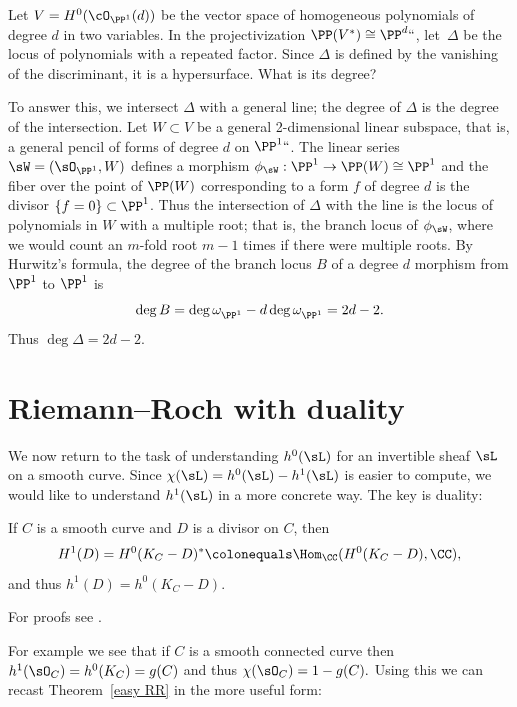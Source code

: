 \begin{example}
Let 
$V= H^0(\cO_{\PP^1}(d))$
be the vector space of  homogeneous polynomials of degree $d$ in
two variables. In the
projectivization $\PP(V^{*}) \cong \PP^d` `$, let~$\Delta$ be the
locus of polynomials with a repeated factor. Since $\Delta$ is
defined by the vanishing of the discriminant, it is a hypersurface.
What is its degree? 
 
To answer this, we intersect $\Delta$ with a general line; the degree
of $\Delta$ is the degree of the intersection.  Let $W\subset V$ be a
general 2-dimensional linear subspace, that is, a general pencil of
forms of degree $d$ on $\PP^1` `$. The linear series $\sW =
(\sO_{\PP^{1}}, W)$ defines a morphism $\phi_{\sW} : \PP^{1} \to
\PP(W) \cong \PP^{1}$ and the fiber over the point of $\PP(W)$
corresponding to a form $f$ of degree $d$ is the divisor $\{f =
0\}\subset \PP^{1}$. Thus the intersection of $\Delta$ with the line
is the locus of polynomials in $W$ with a multiple root; that is, the
branch locus of $\phi_{\sW}$, where we would count an $m$-fold root
$m-1$ times if there were multiple roots. 
 By Hurwitz's formula, the degree of the branch locus $B$ of a 
degree $d$ morphism from $\PP^{1}$ to $\PP^{1}$ is
 $$
 \deg B = \deg \omega^{}_{\PP^{1}} - d\deg \omega^{}_{\PP^{1}} = 2d-2.
 $$
 Thus $\deg \Delta = 2d-2$.
 \end{example}
  

\section{Riemann--Roch with duality}

We now return to the task of understanding $h^0(\sL)$ for an invertible sheaf $\sL$ on a smooth curve. Since $\chi(\sL) = h^0(\sL)-h^1(\sL)$ is easier to compute, we would like to understand $h^1(\sL)$ in a more concrete way. The key is duality:
 
\begin{theorem}\label{sd}
If $C$ is a smooth curve and $D$ is a divisor on $C$, then
%
%
$$
H^1(D) =H^0(K_C-D)^* \colonequals \Hom_\CC(H^0(K_C-D), \CC),
$$
and thus $h^1(D) = h^0(K_C-D)$.
\unif
\end{theorem}

For proofs see \cite[Theorem III.5.2 and III.7.6]{Hartshorne1977}. 

For example we see that if $C$ is a smooth connected curve then $h^1 (\sO_C) = h^0(K_C) = g(C)$ and thus $\chi(\sO_C) = 1-g(C).$   
Using this we can recast Theorem~\ref{easy RR}
in the more useful form:


